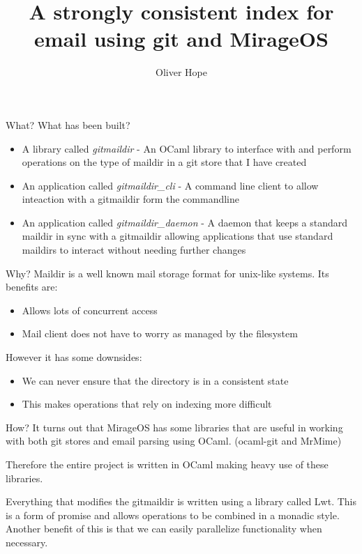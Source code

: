 \documentclass{beamer}
\title{A strongly consistent index for email using git and MirageOS}
\date{}
\author{Oliver Hope}
\institute{Jesus College}
\begin{document}
  \maketitle

  \begin{frame}{What?}
    What has been built?

    \begin{itemize}
      \item A library called \emph{gitmaildir} - An OCaml library to interface with and perform operations on the type of maildir in a git store that I have created
      \item An application called \emph{gitmaildir\_cli} - A command line client to allow inteaction with a gitmaildir form the commandline
      \item An application called \emph{gitmaildir\_daemon} - A daemon that keeps a standard maildir in sync with a gitmaildir allowing applications that use standard maildirs to interact without needing further changes
    \end{itemize}
  \end{frame}

  \begin{frame}{Why?}
    Maildir is a well known mail storage format for unix-like systems. Its benefits are:
    \begin{itemize}
      \item Allows lots of concurrent access
      \item Mail client does not have to worry as managed by the filesystem
    \end{itemize}
    However it has some downsides:
    \begin{itemize}
      \item We can never ensure that the directory is in a consistent state
      \item This makes operations that rely on indexing more difficult
    \end{itemize}
  \end{frame}

  \begin{frame}{How?}
    It turns out that MirageOS has some libraries that are useful in working with both git stores and email parsing using OCaml. (ocaml-git and MrMime)

    Therefore the entire project is written in OCaml making heavy use of these libraries.

    Everything that modifies the gitmaildir is written using a library called Lwt. This is a form of promise and allows operations to be combined in a monadic style. Another benefit of this is that we can easily parallelize functionality when necessary.
  \end{frame}
\end{document}
